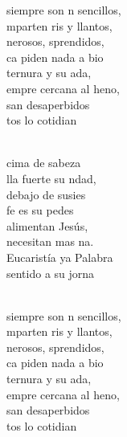 \documentclass[12pt]{article}
\begin{document}
\begin{multicols*}{2}
\begin{cancion}
	\begin{chorus}%
	siempre son n sencillos,\\
	mparten ris y llantos,\\
	nerosos, sprendidos,\\
	ca piden nada a bio\\
	 ternura y su ada,\\
	empre cercana al heno,\\
	san desaperbidos\\
	tos lo cotidian\\
	\end{chorus}%
	\jump\\
	cima de sabeza\\
	lla fuerte su ndad,\\
	debajo de susies\\
	fe es su pedes\\
	 alimentan Jesús,\\
	 necesitan mas na.\\
	 Eucaristía ya Palabra\\
	 sentido a su jorna\\\jump\\
	\begin{chorus}%
	siempre son n sencillos,\\
	mparten ris y llantos,\\
	nerosos, sprendidos,\\
	ca piden nada a bio\\
	 ternura y su ada,\\
	empre cercana al heno,\\
	san desaperbidos\\
	tos lo cotidian\\
	\end{chorus}%
	\jump\\
\end{cancion}%


\end{multicols*}
\end{document}
